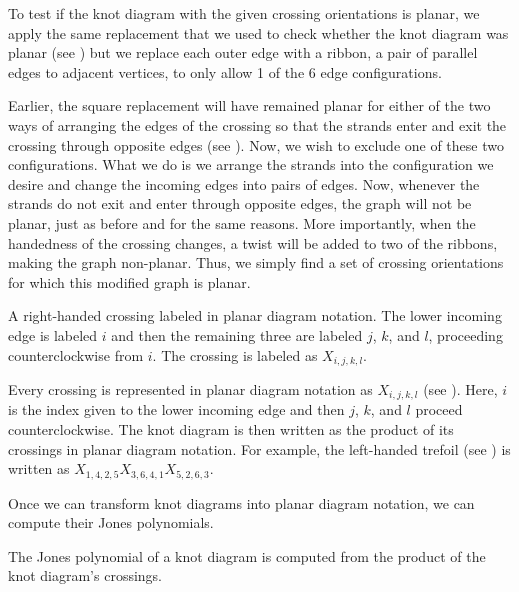 \begin{paper}
To test if the knot diagram with the given crossing orientations is planar, we
apply the same replacement that we used to check whether the knot diagram was
planar (see \figRibbon) but we replace each outer edge with a ribbon, a pair of
parallel edges to adjacent vertices, to only
allow 1 of the 6 edge configurations.

Earlier, the square replacement will have remained planar for either of the two
ways of arranging the edges of the crossing so that the strands enter and exit
the crossing through opposite edges (see \figGraph).
Now, we wish to exclude one of these two configurations.
What we do is we arrange the strands into the configuration we desire and change
the incoming edges into pairs of edges.
Now, whenever the strands do not exit and enter through opposite edges, the
graph will not be planar, just as before and for the same reasons.
More importantly, when the handedness of the crossing changes, a twist will be
added to two of the ribbons, making the graph non-planar.
Thus, we simply find a set of crossing orientations for which this modified
graph is planar.

{A right-handed crossing labeled in planar diagram notation.
The lower incoming edge is labeled $i$ and then the remaining three are labeled
$j$, $k$, and $l$, proceeding counterclockwise from $i$.
The crossing is labeled as $X_{i,j,k,l}$.}

Every crossing is represented in planar diagram notation as $X_{i,j,k,l}$ (see
\figX).
Here, $i$ is the index given to the lower incoming edge and then $j$, $k$, and
$l$ proceed counterclockwise.
The knot diagram is then written as the product of its crossings in planar
diagram notation.
For example, the left-handed trefoil (see \figLabeled) is written as
$X_{1,4,2,5}X_{3,6,4,1}X_{5,2,6,3}$.


Once we can transform knot diagrams into planar diagram notation, we can compute
their Jones polynomials.


The Jones polynomial of a knot diagram is computed from the product of the knot
diagram's crossings.\\


\end{paper}
